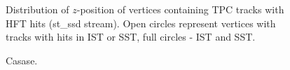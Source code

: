 \begin{figure}[h]
\begin{minipage}{.4725\textwidth}
  \caption[Distribution of $z$-position of vertices with TPC tracks containing hits in HFT.]
   {Distribution of $z$-position of vertices containing TPC tracks with HFT hits (st\_ssd stream). Open circles represent vertices with tracks with hits in IST or SST, full circles - IST and SST.}
   \label{fig:zVtxHFT}%
\end{minipage}%
\end{figure}%



\begin{figure}[hb]
\centering
\parbox{0.4725\textwidth}{
  \centering
  \begin{subfigure}[b]{\linewidth}
                \vspace{-5pt}
  \end{subfigure}
}%
\quad\quad%
\parbox{0.4725\textwidth}{
  \centering
  \begin{subfigure}[b]{\linewidth}
                \vspace{-5pt}
  \end{subfigure}
}%
\caption[dsasas]%
    {Casase.}\label{fig:safsdgf}%
\end{figure}
